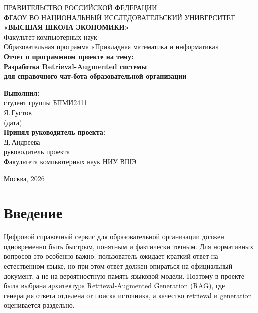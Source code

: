 \documentclass[12pt,a4paper]{article}
\begin{document}
\begin{titlepage}
\centering

{\normalsize ПРАВИТЕЛЬСТВО РОССИЙСКОЙ ФЕДЕРАЦИИ\\
ФГАОУ ВО НАЦИОНАЛЬНЫЙ ИССЛЕДОВАТЕЛЬСКИЙ УНИВЕРСИТЕТ\\
\textbf{«ВЫСШАЯ ШКОЛА ЭКОНОМИКИ»}}\\[1.3cm]

{\normalsize Факультет компьютерных наук}\\
{\normalsize Образовательная программа «Прикладная математика и информатика»}\\[2.5cm]

{\Large \textbf{Отчет о программном проекте на тему:}}\\[0.8cm]

{\normalsize \textbf{Разработка Retrieval-Augmented системы\\
для справочного чат-бота образовательной организации}}\\[2.7cm]

\begin{flushleft}
\textbf{Выполнил:}\\

студент группы БПМИ2411\\
Я.\,Густов\\[0.8cm]

(дата)\\[1.0cm]

\textbf{Принял руководитель проекта:}\\
Д.\,Андреева\\
руководитель проекта\\
Факультета компьютерных наук НИУ ВШЭ
\end{flushleft}

\vfill
{\normalsize Москва, 2026}

\end{titlepage}

\tableofcontents
\newpage

\section{Введение}

Цифровой справочный сервис для образовательной организации должен одновременно быть быстрым, понятным и фактически точным. Для нормативных вопросов это особенно важно: пользователь ожидает краткий ответ на естественном языке, но при этом ответ должен опираться на официальный документ, а не на вероятностную память языковой модели. Поэтому в проекте была выбрана архитектура Retrieval-Augmented Generation (RAG), где генерация ответа отделена от поиска источника, а качество retrieval и generation оценивается раздельно.
\end{document}
